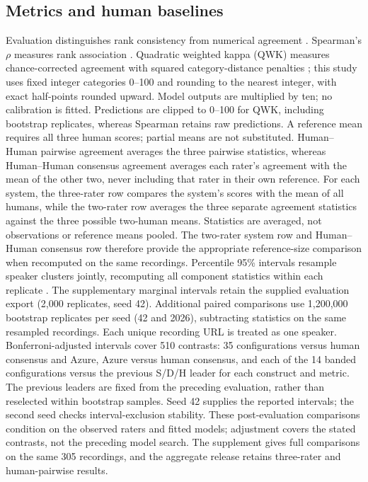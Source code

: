 \documentclass[cameraready]{Interspeech}
\begin{document}
\subsection{Metrics and human baselines}
Evaluation distinguishes rank consistency from numerical agreement \cite{stemler,williamson}. Spearman's $\rho$ measures rank association \cite{spearman}. Quadratic weighted kappa (QWK) measures chance-corrected agreement with squared category-distance penalties \cite{cohen}; this study uses fixed integer categories 0--100 and rounding to the nearest integer, with exact half-points rounded upward. Model outputs are multiplied by ten; no calibration is fitted. Predictions are clipped to 0--100 for QWK, including bootstrap replicates, whereas Spearman retains raw predictions. A reference mean requires all three human scores; partial means are not substituted. Human--Human pairwise agreement averages the three pairwise statistics, whereas Human--Human consensus agreement averages each rater's agreement with the mean of the other two, never including that rater in their own reference. For each system, the three-rater row compares the system's scores with the mean of all humans, while the two-rater row averages the three separate agreement statistics against the three possible two-human means. Statistics are averaged, not observations or reference means pooled. The two-rater system row and Human--Human consensus row therefore provide the appropriate reference-size comparison when recomputed on the same recordings. Percentile 95\% intervals resample speaker clusters jointly, recomputing all component statistics within each replicate \cite{efron,field}. The supplementary marginal intervals retain the supplied evaluation export (2,000 replicates, seed 42). Additional paired comparisons use 1,200,000 bootstrap replicates per seed (42 and 2026), subtracting statistics on the same resampled recordings. Each unique recording URL is treated as one speaker. Bonferroni-adjusted intervals cover 510 contrasts: 35 configurations versus human consensus and Azure, Azure versus human consensus, and each of the 14 banded configurations versus the previous S/D/H leader for each construct and metric. The previous leaders are fixed from the preceding evaluation, rather than reselected within bootstrap samples. Seed 42 supplies the reported intervals; the second seed checks interval-exclusion stability. These post-evaluation comparisons condition on the observed raters and fitted models; adjustment covers the stated contrasts, not the preceding model search. The supplement gives full comparisons on the same 305 recordings, and the aggregate release retains three-rater and human-pairwise results.
\end{document}
